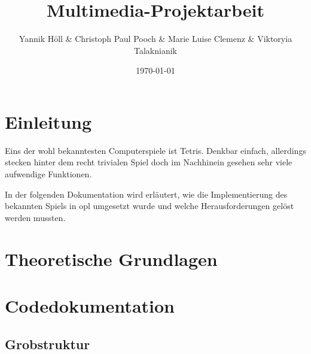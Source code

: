 \documentclass[11pt]{article}
\title{\textbf{Multimedia-Projektarbeit}}
\author{Yannik Höll \& Christoph Paul Pooch \& Marie Luise Clemenz \& Viktoryia Talaknianik}
\date{\today}
\begin{document}
\begin{titlingpage}
    \maketitle
\end{titlingpage}
\pagebreak

\tableofcontents
\pagebreak

\glsaddall
\printglossary 
\pagebreak

\section{Einleitung} 
Eins der wohl bekanntesten Computerspiele ist Tetris. Denkbar einfach, allerdings stecken hinter
dem recht trivialen Spiel doch im Nachhinein gesehen sehr viele aufwendige Funktionen.

In der folgenden Dokumentation wird erläutert, wie die Implementierung des bekannten Spiels in \gls{opl} 
umgesetzt wurde und welche Herausforderungen gelöst werden mussten.


\section{Theoretische Grundlagen}

\section{Codedokumentation}

\subsection{Grobstruktur}
\end{document}

